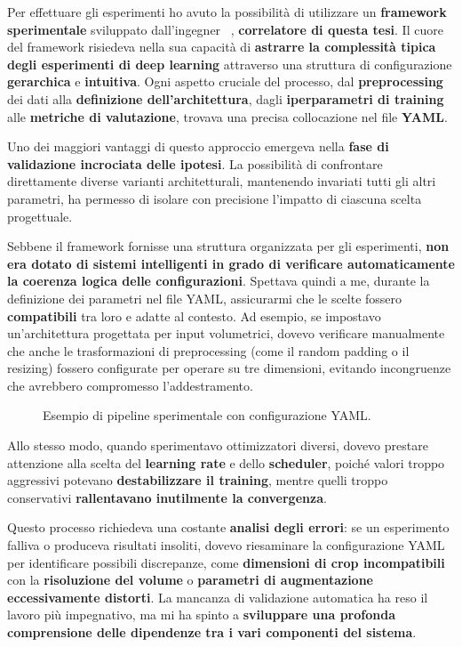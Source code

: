
Per effettuare gli esperimenti ho avuto la possibilità di utilizzare un \textbf{framework sperimentale} sviluppato dall'ingegner  ~\cite{MarcoCantone}, \textbf{correlatore di questa tesi}. Il cuore del framework risiedeva nella sua capacità di \textbf{astrarre la complessità tipica degli esperimenti di deep learning} attraverso una struttura di configurazione \textbf{gerarchica} e \textbf{intuitiva}. Ogni aspetto cruciale del processo, dal \textbf{preprocessing} dei dati alla \textbf{definizione dell'architettura}, dagli \textbf{iperparametri di training} alle \textbf{metriche di valutazione}, trovava una precisa collocazione nel file \textbf{YAML}.

Uno dei maggiori vantaggi di questo approccio emergeva nella \textbf{fase di validazione incrociata delle ipotesi}. La possibilità di confrontare direttamente diverse varianti architetturali, mantenendo invariati tutti gli altri parametri, ha permesso di isolare con precisione l'impatto di ciascuna scelta progettuale.


Sebbene il framework fornisse una struttura organizzata per gli esperimenti, \textbf{non era dotato di sistemi intelligenti in grado di verificare automaticamente la coerenza logica delle configurazioni}. Spettava quindi a me, durante la definizione dei parametri nel file YAML, assicurarmi che le scelte fossero \textbf{compatibili} tra loro e adatte al contesto. Ad esempio, se impostavo un'architettura progettata per input volumetrici, dovevo verificare manualmente che anche le trasformazioni di preprocessing (come il random padding o il resizing) fossero configurate per operare su tre dimensioni, evitando incongruenze che avrebbero compromesso l'addestramento. 

\begin{figure}[H]
  \centering
  
  \caption{Esempio di pipeline sperimentale con configurazione YAML.}
\end{figure}


Allo stesso modo, quando sperimentavo ottimizzatori diversi, dovevo prestare attenzione alla scelta del \textbf{learning rate} e dello \textbf{scheduler}, poiché valori troppo aggressivi potevano \textbf{destabilizzare il training}, mentre quelli troppo conservativi \textbf{rallentavano inutilmente la convergenza}. 

Questo processo richiedeva una costante \textbf{analisi degli errori}: se un esperimento falliva o produceva risultati insoliti, dovevo riesaminare la configurazione YAML per identificare possibili discrepanze, come \textbf{dimensioni di crop incompatibili} con la \textbf{risoluzione del volume} o \textbf{parametri di augmentazione eccessivamente distorti}. La mancanza di validazione automatica ha reso il lavoro più impegnativo, ma mi ha spinto a \textbf{sviluppare una profonda comprensione delle dipendenze tra i vari componenti del sistema}.


